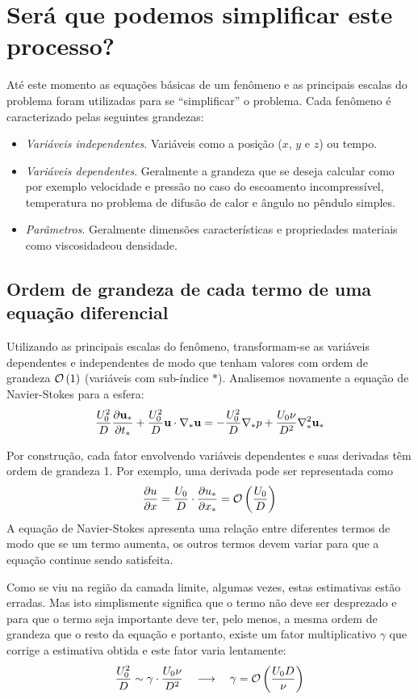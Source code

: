 \section{Será que podemos simplificar este processo?}

Até este momento as equações básicas de um fenômeno e as principais escalas do problema foram utilizadas para se ``simplificar'' o problema. Cada fenômeno é caracterizado pelas seguintes grandezas:
\begin{itemize}
\item \emph{Variáveis independentes}. Variáveis como a posição ($x$, $y$ e $z$) ou tempo.
\item \emph{Variáveis dependentes}. Geralmente a grandeza que se deseja calcular como por exemplo velocidade e pressão no caso do escoamento incompressível, temperatura no problema de difusão de calor e ângulo no pêndulo simples.
\item \emph{Parâmetros}. Geralmente dimensões características e propriedades materiais como viscosidadeou densidade. 
\end{itemize}

\subsection{Ordem de grandeza de cada termo de uma equação diferencial}
Utilizando as principais escalas do fenômeno, transformam-se as variáveis dependentes e independentes de modo que tenham valores com ordem de grandeza $\mathcal{O}\left(1\right)$ (variáveis com sub-índice $*$). Analisemos novamente a equação de Navier-Stokes para a esfera:
\begin{equation}
\frac{U_0^2}{D}\frac{\partial \mathbf{u_*}}{\partial t_*} + \frac{U_0^2}{D} \mathbf{u}\cdot\nabla_* \mathbf{u} = -\frac{U_0^2}{D}\nabla_* p + \frac{U_0\nu}{D^2}\nabla_*^2 \mathbf{u_*} 
\label{eq:ns2}
\end{equation}

Por construção, cada fator envolvendo variáveis dependentes e suas derivadas têm ordem de grandeza 1. Por exemplo, uma derivada pode ser representada como 
\[
\frac{\partial u}{\partial x} = \frac{U_0}{D}\cdot\frac{\partial u_*}{\partial x_*} = \mathcal{O}\left(\frac{U_0}{D}\right)
\]
A equação de Navier-Stokes apresenta uma relação entre diferentes termos de modo que se um termo aumenta, os outros termos devem variar para que a equação continue sendo satisfeita.

Como se viu na região da camada limite, algumas vezes, estas estimativas estão erradas. Mas isto simplismente significa que o termo não deve ser desprezado e para que o termo seja importante deve ter, pelo menos, a mesma ordem de grandeza que o resto da equação e portanto, existe um fator multiplicativo $\gamma$ que corrige a estimativa obtida e este fator varia lentamente:
\[
\frac{U_0^2}{D} \sim \gamma \cdot \frac{U_0\nu}{D^2} \quad\longrightarrow\quad \gamma = \mathcal{O}\left(\frac{U_0 D}{\nu}\right)
\]

